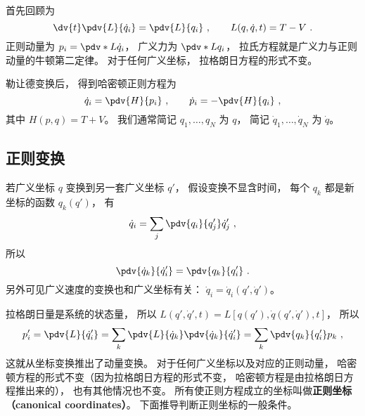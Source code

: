 
\begin{issues}
\issueDraft
\end{issues}


首先回顾为
\begin{equation}
\dv{t} \pdv{L}{\dot q_i}  = \pdv{L}{q_i} ~, \qquad L(q,\dot q, t) = T - V~.
\end{equation}
正则动量为 $p_i = \pdv*{L}{\dot q_i}$， 广义力为 $\pdv*{L}{q_i}$，  拉氏方程就是广义力与正则动量的牛顿第二定律。 对于任何广义坐标， 拉格朗日方程的形式不变。

勒让德变换后， 得到哈密顿正则方程为
\begin{equation}
\dot q_i = \pdv{H}{p_i} ~,\qquad
\dot p_i = -\pdv{H}{q_i}~,
\end{equation} 
其中 $H(p,q) = T + V$。 我们通常简记 $q_1, \dots, q_N$ 为 $q$， 简记 $\dot q_1, \dots, \dot q_N$ 为 $\dot q$。

\subsection{正则变换}

若广义坐标 $q$ 变换到另一套广义坐标 $q'$， 假设变换不显含时间， 每个 $q_k$ 都是新坐标的函数 $q_k(q')$， 有
\begin{equation}
\dot q_i = \sum_j \pdv{q_i}{q'_j} \dot q'_j~,
\end{equation}
所以
\begin{equation}
\pdv{\dot q_k}{\dot q'_i} = \pdv{q_k}{q'_i}~.
\end{equation}
另外可见广义速度的变换也和广义坐标有关： $\dot q_i = \dot q_i(q', \dot q')$。

拉格朗日量是系统的状态量， 所以 $L(q',\dot q', t) = L[q(q'),\dot q(q',\dot q'), t]$，  所以
\begin{equation}
p'_i = \pdv{L}{\dot q'_i} = \sum_k \pdv{L}{\dot q_k} \pdv{\dot q_k}{\dot q'_i}  = \sum_k \pdv{q_k}{q'_i} p_k~,
\end{equation}
这就从坐标变换推出了动量变换。 对于任何广义坐标以及对应的正则动量， 哈密顿方程的形式不变（因为拉格朗日方程的形式不变， 哈密顿方程是由拉格朗日方程推出来的）， 也有其他情况也不变。 所有使正则方程成立的坐标叫做\textbf{正则坐标（canonical coordinates）}。 下面推导判断正则坐标的一般条件。

